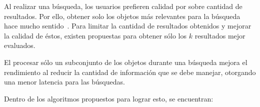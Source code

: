 


Al realizar una búsqueda, los usuarios prefieren calidad por sobre cantidad de
resultados. Por ello, obtener solo los objetos más relevantes para la
búsqueda hace mucho sentido~\citealt{oulasvirta2009more}. %
Para limitar la cantidad de resultados obtenidos y mejorar la calidad de éstos,
existen propuestas para obtener sólo los $k$ resultados mejor evaluados.

El procesar sólo un subconjunto de los objetos durante una búsqueda mejora el
rendimiento al reducir la cantidad de información que se debe manejar, otorgando
una menor latencia para las búsquedas.

Dentro de los algoritmos propuestos para lograr esto, se encuentran:



%

